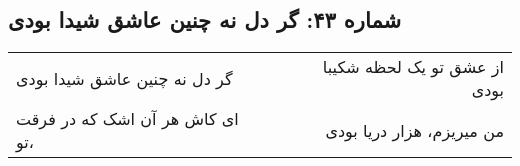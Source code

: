 \begin{center}
\section*{شماره ۴۳: گر دل نه چنین عاشق شیدا بودی}
\label{sec:043}
\begin{longtable}{l p{0.5cm} r}
گر دل نه چنین عاشق شیدا بودی
&&
از عشق تو یک لحظه شکیبا بودی
\\
ای کاش هر آن اشک که در فرقت تو،
&&
من میریزم، هزار دریا بودی
\\
\end{longtable}
\end{center}
